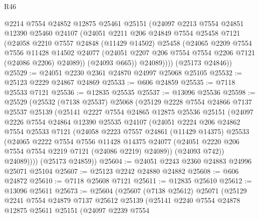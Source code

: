 \begin{lexlean}{R46}
\begin{coremodule}
          @2214
          @7554
          @24852
          @12875
          @25461
          @25151
          (@24097
            @2213
            @7554
            @24851
            @12390
            @25460
            @24107
            (@24051
              @2211
              @206
              @24849
              @7554
              @25458
              @7121
              (@24058
                @2210
                @7557
                @24848
                (@11429 @14502)
                @25458
                (@24065
                  @2209
                  @7554
                  @7556
                  @11428
                  @14502
                  @24077
                  (@24051 @2207 @206 @7554 @7554 @2206 @7121 (@24086 @2206) @24089))
                (@24093 @665))
              @24089))))
      (@25173 @24846))
@25529 := @24051 @2230 @2361 @24870 @24997 @25068 @25105
@25532 := @25123 @2229 @24867 @24869
@25533 := @606 @24859
@25535 := @7118 @25533 @7121
@25536 := @12835 @25535
@25537 := @13096 @25536
@25598 := @25529
    (@25532
      (@7138 @25537)
      @25068
      (@25129
        @2228
        @7554
        @24866
        @7137
        @25537
        @25139
        (@25141
          @2227
          @7554
          @24865
          @12875
          @25536
          @25151
          (@24097
            @2226
            @7554
            @24864
            @12390
            @25535
            @24107
            (@24051
              @2224
              @206
              @24862
              @7554
              @25533
              @7121
              (@24058
                @2223
                @7557
                @24861
                (@11429 @14375)
                @25533
                (@24065
                  @2222
                  @7554
                  @7556
                  @11428
                  @14375
                  @24077
                  (@24051 @2220 @206 @7554 @7554 @2219 @7121 (@24086 @2219) @24089))
                (@24093 @742))
              @24089))))
      (@25173 @24859))
@25604 := @24051 @2243 @2360 @24883 @24996 @25071 @25104
@25607 := @25123 @2242 @24880 @24882
@25608 := @606 @24872
@25610 := @7118 @25608 @7121
@25611 := @12835 @25610
@25612 := @13096 @25611
@25673 := @25604
    (@25607
      (@7138 @25612)
      @25071
      (@25129
        @2241
        @7554
        @24879
        @7137
        @25612
        @25139
        (@25141
          @2240
          @7554
          @24878
          @12875
          @25611
          @25151
          (@24097
            @2239
            @7554

\end{coremodule}
\end{lexlean}
